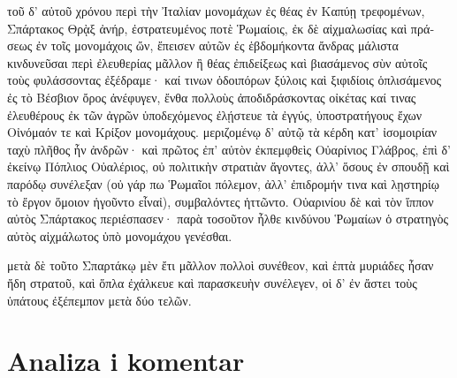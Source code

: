 \medskip


{\large

\begin{greek}

\noindent  τοῦ δ' αὐτοῦ χρόνου περὶ τὴν Ἰταλίαν μονομάχων ἐς θέας ἐν Καπύῃ τρεφομένων, Σπάρτακος Θρᾲξ ἀνήρ, ἐστρατευμένος ποτὲ Ῥωμαίοις, ἐκ δὲ αἰχμαλωσίας καὶ πράσεως ἐν τοῖς μονομάχοις ὤν, ἔπεισεν αὐτῶν ἐς ἑβδομήκοντα ἄνδρας μάλιστα κινδυνεῦσαι περὶ ἐλευθερίας μᾶλλον ἢ θέας ἐπιδείξεως καὶ βιασάμενος σὺν αὐτοῖς τοὺς φυλάσσοντας ἐξέδραμε· καί τινων ὁδοιπόρων ξύλοις καὶ ξιφιδίοις ὁπλισάμενος ἐς τὸ Βέσβιον ὄρος ἀνέφυγεν, ἔνθα πολλοὺς ἀποδιδράσκοντας οἰκέτας καί τινας ἐλευθέρους ἐκ τῶν ἀγρῶν ὑποδεχόμενος ἐλῄστευε τὰ ἐγγύς, ὑποστρατήγους ἔχων Οἰνόμαόν τε καὶ Κρίξον μονομάχους. μεριζομένῳ δ' αὐτῷ τὰ κέρδη κατ' ἰσομοιρίαν ταχὺ πλῆθος ἦν ἀνδρῶν· καὶ πρῶτος ἐπ' αὐτὸν ἐκπεμφθεὶς Οὐαρίνιος Γλάβρος, ἐπὶ δ' ἐκείνῳ Πόπλιος Οὐαλέριος, οὐ πολιτικὴν στρατιὰν ἄγοντες, ἀλλ' ὅσους ἐν σπουδῇ καὶ παρόδῳ συνέλεξαν (οὐ γάρ πω Ῥωμαῖοι πόλεμον, ἀλλ' ἐπιδρομήν τινα καὶ λῃστηρίῳ τὸ ἔργον ὅμοιον ἡγοῦντο εἶναἰ), συμβαλόντες ἡττῶντο. Οὐαρινίου δὲ καὶ τὸν ἵππον αὐτὸς Σπάρτακος περιέσπασεν· παρὰ τοσοῦτον ἦλθε κινδύνου Ῥωμαίων ὁ στρατηγὸς αὐτὸς αἰχμάλωτος ὑπὸ μονομάχου γενέσθαι.

μετὰ δὲ τοῦτο Σπαρτάκῳ μὲν ἔτι μᾶλλον πολλοὶ συνέθεον, καὶ ἑπτὰ μυριάδες ἦσαν ἤδη στρατοῦ, καὶ ὅπλα ἐχάλκευε καὶ παρασκευὴν συνέλεγεν, οἱ δ' ἐν ἄστει τοὺς ὑπάτους ἐξέπεμπον μετὰ δύο τελῶν.

\end{greek}

}


\section*{Analiza i komentar}


